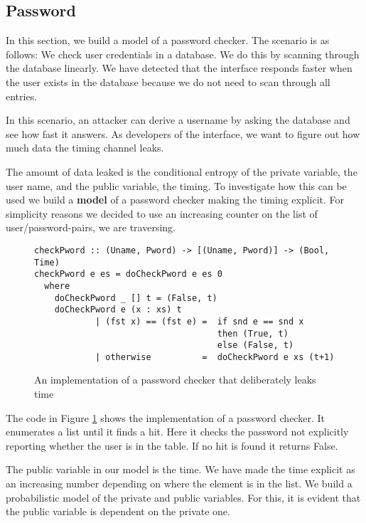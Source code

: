 \subsection{Password}
In this section, we build a model of a password checker. The scenario is as
follows: We check user credentials in a database. We do this by scanning
through the database linearly. We have detected that the interface
responds faster when the user exists in the database because we do not
need to scan through all entries.

In this scenario, an attacker can derive a username by asking the database
and see how fast it answers. As developers of the interface, we want to figure
out how much data the timing channel leaks.

The amount of data leaked is the conditional entropy of the private
variable, the user name, and the public variable, the timing. To investigate
how this can be used we build a \textbf{model} of a password checker
making the timing explicit.
For simplicity reasons we decided to use an increasing counter on
the list of user/password-pairs, we are traversing.

\begin{figure}
\begin{center}
\begin{verbatim}
checkPword :: (Uname, Pword) -> [(Uname, Pword)] -> (Bool, Time)
checkPword e es = doCheckPword e es 0
  where
    doCheckPword _ [] t = (False, t)
    doCheckPword e (x : xs) t 
            | (fst x) == (fst e) =  if snd e == snd x 
                                    then (True, t)
                                    else (False, t)
            | otherwise          =  doCheckPword e xs (t+1)
\end{verbatim}
\end{center}
\caption{An implementation of a password checker that deliberately leaks time}
\label{code:check/pword}
\end{figure}

The code in Figure \ref{code:check/pword} shows the implementation of a password
checker. It enumerates a list until it finds a hit. Here it checks the
password not explicitly reporting whether the user is in the table. If no hit
is found it returns False.

The public variable in our model is the time. We have made the time explicit as
an increasing number depending on where the element is in the list.
We build a probabilistic model of the private and public variables.
For this, it is evident that the public variable is dependent on the private
one.

